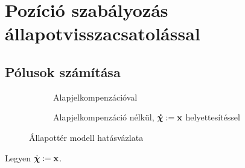 \section{Pozíció szabályozás állapotvisszacsatolással}

\subsection{Pólusok számítása}

\begin{figure}[H]
    \centering
	\begin{subfigure}[H]{\textwidth}
		\centering
		\caption{Alapjelkompenzációval}
		\label{fig:6a_allapotter_hatasvazlat}
	\end{subfigure}
	\begin{subfigure}[H]{\textwidth}
		\centering
		\caption{Alapjelkompenzáció nélkül, $\boldsymbol{\mathrm{\dot{\chi}}}:=\boldsymbol{\mathrm{x}}$ helyettesítéssel}
		\label{fig:6a_allapotter_hatasvazlat}
	\end{subfigure}
	\caption{Állapottér modell hatásvázlata}
\end{figure}


Legyen $\dot{\boldsymbol{\mathrm{\chi}}}:=\boldsymbol{\mathrm{x}}$.

